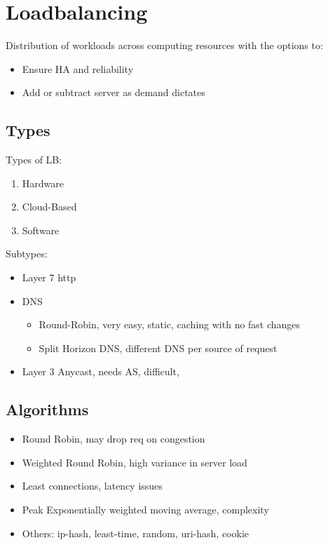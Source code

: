 \documentclass[../Main.tex]{subfiles}
\begin{document}
\section{Loadbalancing}
Distribution of workloads across computing resources
with the options to:
\begin{itemize}
    \item Ensure HA and reliability
    \item Add or subtract server as demand dictates
\end{itemize}

\subsection{Types}
Types of LB:
\begin{enumerate}
    \item Hardware
    \item Cloud-Based
    \item Software
\end{enumerate}

Subtypes:
\begin{itemize}
    \item Layer 7 http
    \item DNS
        \begin{itemize}
            \item Round-Robin, very easy, static, caching with no fast changes
            \item Split Horizon DNS, different DNS per source of request
        \end{itemize}
    \item Layer 3 Anycast, needs AS, difficult, 
    
\end{itemize}

\subsection{Algorithms}
\begin{itemize}
    \item Round Robin, may drop req on congestion
    \item Weighted Round Robin, high variance in server load
    \item Least connections, latency issues
    \item Peak Exponentially weighted moving average, complexity
    \item Others: ip-hash, least-time, random, uri-hash, cookie
\end{itemize}
\end{document}
